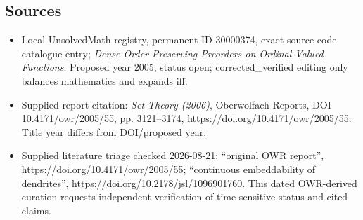 \documentclass[11pt]{article}
\begin{document}
\subsection{Sources}
\begin{itemize}
\item Local UnsolvedMath registry, permanent ID 30000374, exact source code catalogue entry; \emph{Dense-Order-Preserving Preorders on Ordinal-Valued Functions}. Proposed year 2005, status open; corrected\_verified editing only balances mathematics and expands iff.
\item Supplied report citation: \emph{Set Theory (2006)}, Oberwolfach Reports, DOI 10.4171/owr/2005/55, pp. 3121--3174, \url{https://doi.org/10.4171/owr/2005/55}. Title year differs from DOI/proposed year.
\item Supplied literature triage checked 2026-08-21: ``original OWR report'', \url{https://doi.org/10.4171/owr/2005/55}; ``continuous embeddability of dendrites'', \url{https://doi.org/10.2178/jsl/1096901760}. This dated OWR-derived curation requests independent verification of time-sensitive status and cited claims.
\end{itemize}
\end{document}

